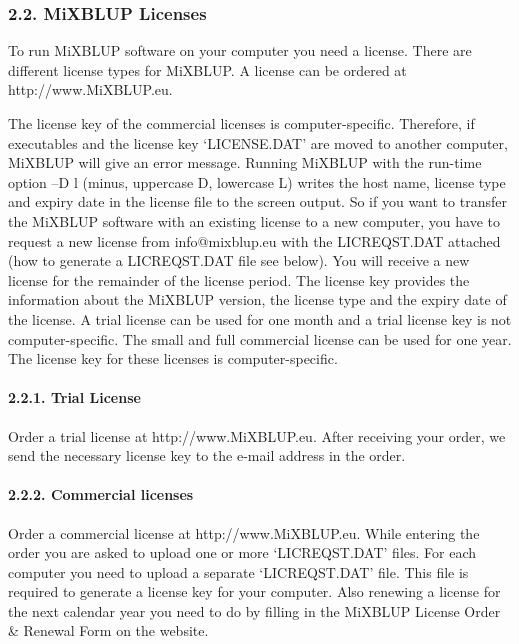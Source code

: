 \subsubsection{2.2. MiXBLUP Licenses}\label{HowT03}

To run MiXBLUP software on your computer you need a license. There are
different license types for MiXBLUP. A license can be ordered at
http://www.MiXBLUP.eu.

The license key of the commercial licenses is computer-specific.
Therefore, if executables and the license key `LICENSE.DAT' are moved to
another computer, MiXBLUP will give an error message. Running MiXBLUP
with the run-time option --D l (minus, uppercase D, lowercase L) writes
the host name, license type and expiry date in the license file to the
screen output. So if you want to transfer the MiXBLUP software with an
existing license to a new computer, you have to request a new license
from info@mixblup.eu with the LICREQST.DAT attached (how to generate a
LICREQST.DAT file see below). You will receive a new license for the
remainder of the license period. The license key provides the
information about the MiXBLUP version, the license type and the expiry
date of the license. A trial license can be used for one month and a
trial license key is not computer-specific. The small and full
commercial license can be used for one year. The license key for these
licenses is computer-specific.

\paragraph{2.2.1. Trial License}\label{HowT04}

Order a trial license at http://www.MiXBLUP.eu. After receiving your
order, we send the necessary license key to the e-mail address in the
order.

\paragraph{2.2.2. Commercial licenses}\label{HowT05}

Order a commercial license at http://www.MiXBLUP.eu. While entering the
order you are asked to upload one or more `LICREQST.DAT' files. For each
computer you need to upload a separate `LICREQST.DAT' file. This file is
required to generate a license key for your computer. Also renewing a
license for the next calendar year you need to do by filling in the
MiXBLUP License Order \& Renewal Form on the website.

